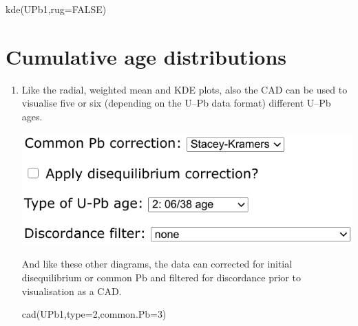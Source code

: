 \begin{refsection}
\begin{enumerate}
\begin{console}
kde(UPb1,rug=FALSE)
\end{console}

\end{enumerate}

\section{Cumulative age distributions}
\label{sec:UPbCAD}

\begin{enumerate}

\item Like the radial, weighted mean and KDE plots, also the CAD can
  be used to visualise five or six (depending on the U--Pb data
  format) different U--Pb ages.

\noindent\begin{minipage}[t]{.5\linewidth}
\strut\vspace*{-\baselineskip}\newline
\includegraphics[width=\linewidth]{../figures/UPbCADageTypes.png}
\end{minipage}
\begin{minipage}[t]{.5\linewidth}
  And like these other diagrams, the data can corrected for initial
  disequilibrium or common Pb and filtered for discordance prior to
  visualisation as a CAD.
\end{minipage}

\begin{console}
cad(UPb1,type=2,common.Pb=3)
\end{console}

\end{enumerate}

\printbibliography[heading=subbibliography]

\end{refsection}
